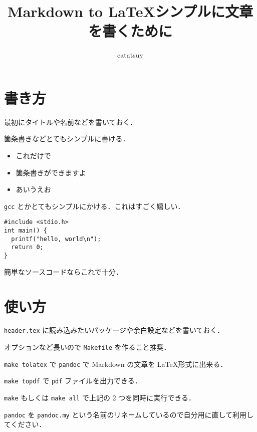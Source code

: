 \documentclass[12Q,papersize]{jsarticle}
\title{Markdown to \LaTeX \linebreak シンプルに文章を書くために}
\author{catatsuy}
\date{}
\begin{document}
\maketitle

\section{書き方}

最初にタイトルや名前などを書いておく．

箇条書きなどとてもシンプルに書ける．

\begin{itemize}
\itemsep1pt\parskip0pt
\item
  これだけで
\item
  箇条書きができますよ
\item
  あいうえお
\end{itemize}

\verb`gcc` とかとてもシンプルにかける．これはすごく嬉しい．

\begin{verbatim}
#include <stdio.h>
int main() {
  printf("hello, world\n");
  return 0;
}
\end{verbatim}

簡単なソースコードならこれで十分．

\section{使い方}

\verb`header.tex` に読み込みたいパッケージや余白設定などを書いておく．

オプションなど長いので \verb`Makefile` を作ること推奨．

\verb`make tolatex` で \verb`pandoc` で Markdown の文章を
\LaTeX 形式に出来る．

\verb`make topdf` で \verb`pdf` ファイルを出力できる．

\verb`make` もしくは \verb`make all` で上記の 2 つを同時に実行できる．

\verb`pandoc` を \verb`pandoc.my`
という名前のリネームしているので自分用に直して利用してください．
\end{document}
